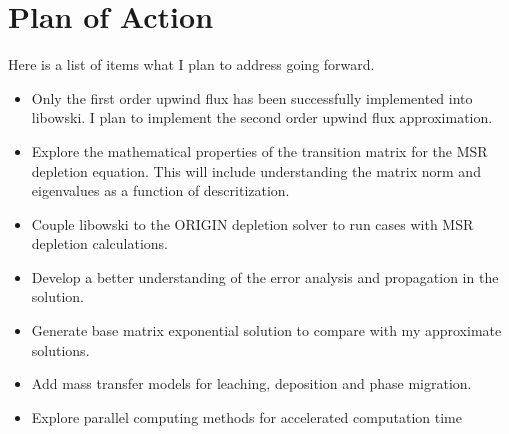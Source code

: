 \chapter{Plan of Action} \label{ch:planOfAction}

Here is a list of items what I plan to address going forward.

\begin{itemize}
    \item Only the first order upwind flux has been successfully implemented into libowski. I plan to implement the second order upwind flux approximation.
    \item Explore the mathematical properties of the transition matrix for the MSR depletion equation. This will include understanding the matrix norm and eigenvalues as a function of descritization. 
    \item Couple libowski to the ORIGIN depletion solver to run cases with MSR depletion calculations. 
    \item Develop a better understanding of the error analysis and propagation in the solution.
    \item Generate base matrix exponential solution to compare with my approximate solutions.
    \item Add mass transfer models for leaching, deposition and phase migration.
    \item Explore parallel computing methods for accelerated computation time
\end{itemize}
